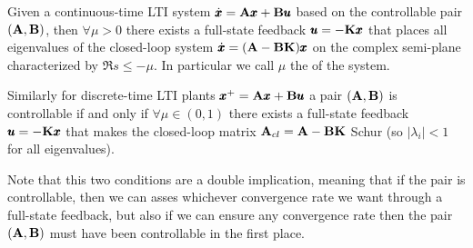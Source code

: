 	\begin{theorem}
		Given a continuous-time LTI system $\dot{\pmb{x}} = \mathbf{A} \pmb{x}+ \mathbf{B} \pmb{u}$ based on the controllable pair $(\mathbf{A},\mathbf{B})$, then $\forall \mu > 0$ there exists a full-state feedback $\pmb{u} = -\mathbf{K} \pmb{x}$ that places all eigenvalues of the closed-loop system $\dot{\pmb{x}} = (\mathbf{A} - \mathbf{B}\mathbf{K})\pmb{x}$ on the complex semi-plane characterized by $\Re s \leq - \mu$. In particular we call $\mu$ the  of the system.
		
		Similarly for discrete-time LTI plants $\pmb{x}^+ = \mathbf{A} \pmb{x} + \mathbf{B}\pmb{u}$ a pair $(\mathbf{A},\mathbf{B})$ is controllable if and only if $\forall \mu \in(0,1)$ there exists a full-state feedback $\pmb{u} = - \mathbf{K}\pmb{x}$ that makes the closed-loop matrix $\mathbf{A}_{cl} = \mathbf{A}- \mathbf{B}\mathbf{K}$ Schur (so $|\lambda_i| < 1$ for all eigenvalues).
	\end{theorem}
	Note that this two conditions are a double implication, meaning that if the pair is controllable, then we can asses whichever convergence rate we want through a full-state feedback, but also if we can ensure any convergence rate then the pair $(\mathbf{A},\mathbf{B})$ must have been controllable in the first place.
	
